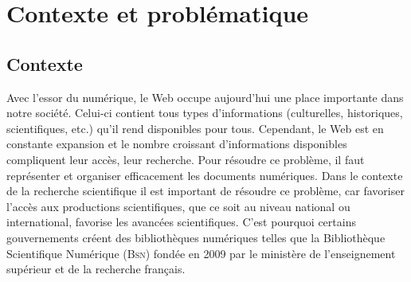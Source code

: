   \chapter{Contexte et problématique}
    \section{Contexte}
      Avec l'essor du numérique, le Web occupe aujourd'hui une place importante
      dans notre société. Celui-ci contient tous types d'informations
      (culturelles, historiques, scientifiques, etc.) qu'il rend disponibles
      pour tous. Cependant, le Web est en constante expansion et le nombre
      croissant d'informations disponibles compliquent leur accès, leur
      recherche. Pour résoudre ce problème, il faut représenter et organiser
      efficacement les documents numériques. Dans le contexte de la recherche
      scientifique il est important de résoudre ce problème, car favoriser
      l'accès aux productions scientifiques, que ce soit au niveau national ou
      international, favorise les avancées scientifiques. C'est pourquoi
      certains gouvernements créent des bibliothèques numériques telles que la
      Bibliothèque Scientifique Numérique (\textsc{Bsn}) fondée en 2009 par le
      ministère de l'enseignement supérieur et de la recherche français.

